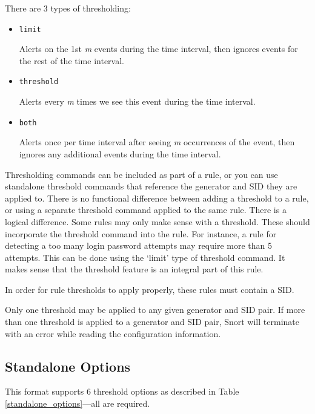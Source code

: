 \documentclass[english]{report}
\begin{document}
There are 3 types of thresholding:

\begin{itemize} 

\item \texttt{limit} 

Alerts on the 1st \textit{m} events during the time interval, then ignores events for the
rest of the time interval.

\item \texttt{threshold} 

Alerts every \textit{m} times we see this event during the time interval.

\item \texttt{both} 

Alerts once per time interval after seeing \textit{m} occurrences of the event, then
ignores any additional events during the time interval.
\end{itemize}


Thresholding commands can be included as part of a rule, or you can use
standalone threshold commands that reference the generator and SID they are
applied to. There is no functional difference between adding a threshold to a
rule, or using a separate threshold command applied to the same rule.   There
is a logical difference.  Some rules may only make sense with a threshold.
These should incorporate the threshold command into the rule.  For instance, a
rule for detecting a too many login password attempts may require more than 5
attempts.  This can be done using the `limit' type of threshold command.  It
makes sense that the threshold feature is an integral part of this rule.

In order for rule thresholds to apply properly, these rules must contain a
SID.

Only one threshold may be applied to any given generator and SID pair.  If more
than one threshold is applied to a generator and SID pair, Snort will terminate
with an error while reading the configuration information. 
                 
\subsection{Standalone Options}

This format supports 6 threshold options as described in Table \ref{standalone_options}---all are required.
\end{document}
